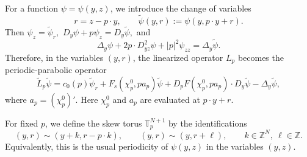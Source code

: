 \documentclass[preprint]{elsarticle}
\numberwithin{equation}{section}
\begin{document}
For a function $\psi=\psi(y,z)$, we introduce the change of variables
$$
r=z-p\cdot y,
\qquad
\widetilde\psi(y,r):=\psi(y,p\cdot y+r).
$$
Then
$
\psi_z=\widetilde\psi_r,
$ $
D_y\psi+p\psi_z=D_y\widetilde\psi,
$
and
\begin{equation*}
\Delta_y\psi
+
2p\cdot D^2_{yz}\psi
+
|p|^2\psi_{zz}
=
\Delta_y\widetilde\psi.
\end{equation*}
Therefore, in the variables $(y,r)$, the linearized operator $L_p$ becomes the periodic-parabolic operator
\begin{equation}
\widetilde L_p\widetilde\psi
=
c_0(p)\widetilde\psi_r
+
F_s(\chi_p^0,p a_p)\widetilde\psi
+
D_pF(\chi_p^0,p a_p)\cdot D_y\widetilde\psi
-
\Delta_y\widetilde\psi, \label{periodic parabolic}
\end{equation}
where
$
a_p=(\chi_p^0)'.
$
Here $\chi_p^0$ and $a_p$ are evaluated at $p\cdot y+r$.

For fixed $p$, we define the skew torus $\mathbb T_p^{N+1}$ by the identifications
$$
(y,r)\sim(y+k,r-p\cdot k),
\qquad
(y,r)\sim(y,r+\ell),
\qquad
k\in\mathbb Z^N,\ \ell\in\mathbb Z.
$$
Equivalently, this is the usual periodicity of $\psi(y,z)$ in the variables $(y,z)$.
\end{document}
